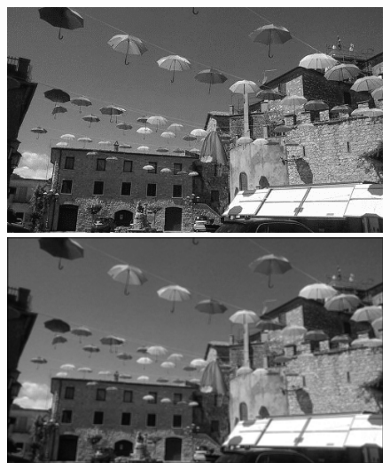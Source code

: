 \documentclass{article}
\begin{document}
	\begin{figure}[!ht]	
	\centering	
	\includegraphics[scale=1.2]{img/gray-obraz1}
	\includegraphics[scale=1.2]{img/filtrowanie/gray-dolnoprzepustowe}
	

\end{figure}
\end{document}
